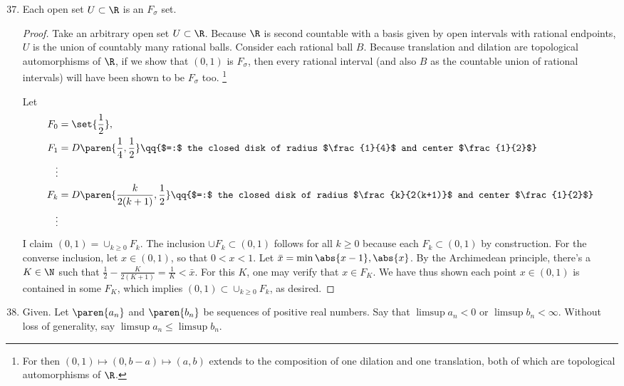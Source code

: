 \documentclass[onesided]{ccg-pset}
\begin{document}
\begin{enumerate}
\setcounter{enumi}{36}

\item Each open set $U \subset \R$ is an $F_\sigma$ set.
\begin{proof}
Take an arbitrary open set $U \subset\R$. 
Because $\R$ is second countable with a basis given by open intervals with rational endpoints, $U$ is the union of countably many rational balls.
Consider each rational ball $B$. Because translation and dilation are topological automorphisms of $\R$, if we show that $(0,1)$ is $F_\sigma$, then every rational interval (and also $B$ as the countable union of rational intervals) will have been shown to be $F_\sigma$ too.%
    \footnote{%
    For then $(0,1) \mapsto (0,b-a) \mapsto (a,b)$ extends to the composition of one dilation and one translation, both of which are topological automorphisms of $\R$.
    }
    

Let 
\begin{align*}
    F_0 &= \set{\frac{1}{2}},\\
    F_1 &= D\paren{\frac{1}{4}, \frac{1}{2}} \qq{$=:$ the closed disk of radius $\frac{1}{4}$ and center $\frac{1}{2}$}\\
    \vdots\\
    F_k &= D\paren{\frac{k}{2(k+1)}, \frac{1}{2}} \qq{$=:$ the closed disk of radius $\frac{k}{2(k+1)}$ and center $\frac{1}{2}$}\\
    \vdots\\
\end{align*}
I claim $(0,1) = \cup_{k \ge 0} F_k$. The inclusion $\cup F_k \subset (0,1)$ follows for all $k \ge 0$ because each $F_k \subset (0,1)$ by construction. For the converse inclusion, let $x \in (0,1)$, so that $0 < x< 1$. Let $\bar{x} = \min{\abs{x-1}, \abs{x}}$. By the Archimedean principle, there's a $K \in \N$ such that $\frac{1}{2} - \frac{K}{2(K+1)} = \frac{1}{K} < \bar{x}$. For this $K$, one may verify that $x \in F_K$. We have thus shown each point $x \in (0,1)$ is contained in some $F_K$, which implies $(0,1) \subset \cup_{k\ge 0} F_k$, as desired.
\end{proof}

\setcounter{enumi}{41}

\item Given. 
Let $\paren{a_n}$ and $\paren{b_n}$ be sequences of positive real numbers. 
Say that $\limsup a_n < 0$ or $\limsup b_n < \infty$. Without loss of generality, say $\limsup a_n \le \limsup b_n$.


\end{enumerate}
\end{document}
